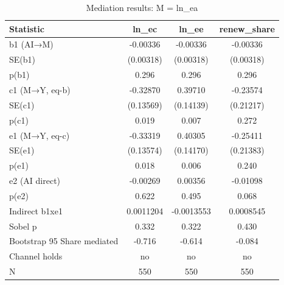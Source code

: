 \begin{table}[htbp]
\centering
\caption{Mediation results: M = ln_ea}
\begin{tabular}{lccc}
\toprule
Statistic & ln\_ec & ln\_ee & renew\_share \\
\midrule
b1 (AI→M) & -0.00336 & -0.00336 & -0.00336 \\
SE(b1) & (0.00318) & (0.00318) & (0.00318) \\
p(b1) & 0.296 & 0.296 & 0.296 \\
c1 (M→Y, eq-b) & -0.32870 & 0.39710 & -0.23574 \\
SE(c1) & (0.13569) & (0.14139) & (0.21217) \\
p(c1) & 0.019 & 0.007 & 0.272 \\
e1 (M→Y, eq-c) & -0.33319 & 0.40305 & -0.25411 \\
SE(e1) & (0.13574) & (0.14170) & (0.21383) \\
p(e1) & 0.018 & 0.006 & 0.240 \\
e2 (AI direct) & -0.00269 & 0.00356 & -0.01098 \\
p(e2) & 0.622 & 0.495 & 0.068 \\
Indirect b1xe1 & 0.0011204 & -0.0013553 & 0.0008545 \\
Sobel p & 0.332 & 0.322 & 0.430 \\
Bootstrap 95%
Share mediated & -0.716 & -0.614 & -0.084 \\
Channel holds & no & no & no \\
\midrule
N & 550 & 550 & 550 \\
\bottomrule
\end{tabular}
\label{tab:h2_ln_ea}
\end{table}
